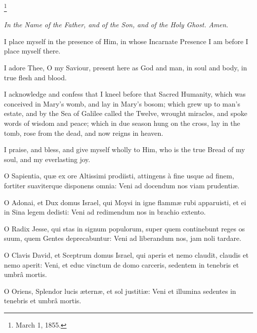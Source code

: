 

\footnote{

March 1, 1855.}

\emph{In the Name of the Father,
and of the Son, and of the Holy Ghost. Amen}.

I place myself in the presence
of Him, in whose Incarnate Presence I am before I place myself there.

I adore Thee, O my Saviour,
present here as God and man, in soul and body, in true flesh and blood.

I acknowledge and confess that I
kneel before that Sacred Humanity, which was conceived in Mary's womb,
and lay in Mary's bosom; which grew up to man's estate, and by the Sea
of Galilee called the Twelve, wrought miracles, and spoke words of
wisdom and peace; which in due season hung on the cross, lay in the
tomb, rose from the dead, and now reigns in heaven.

I praise, and bless, and give
myself wholly to Him, who is the true Bread of my soul, and my
everlasting joy.


O Sapientia, quæ ex ore
Altissimi prodiisti, attingens à fine usque ad finem, fortiter
suaviterque disponens omnia: Veni ad docendum nos viam prudentiæ.


O Adonai, et Dux domus Israel,
qui Moysi in igne flammæ rubi apparuisti, et ei in Sina legem dedisti:
Veni ad redimendum nos in brachio extento.


O Radix Jesse, qui stas in
signum populorum, super quem continebunt reges os suum, quem Gentes
deprecabuntur: Veni ad liberandum nos, jam noli tardare.


O Clavis David, et Sceptrum
domus Israel, qui aperis et nemo claudit, claudis et nemo aperit: Veni,
et educ vinctum de domo carceris, sedentem in tenebris et umbrâ mortis.


O Oriens, Splendor lucis æternæ,
et sol justitiæ: Veni et illumina sedentes in tenebris et umbrâ
mortis.



